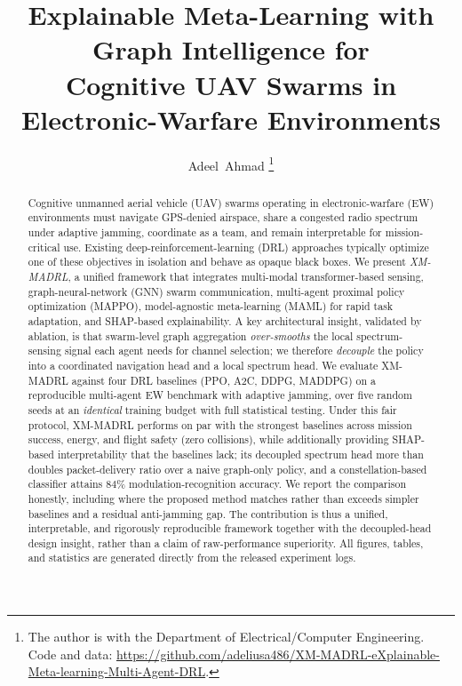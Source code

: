 \documentclass[journal]{IEEEtran}
\begin{document}
\title{Explainable Meta-Learning with Graph Intelligence for\\
Cognitive UAV Swarms in Electronic-Warfare Environments}

\author{Adeel~Ahmad
\thanks{The author is with the Department of Electrical/Computer Engineering.
Code and data: \url{https://github.com/adeliusa486/XM-MADRL-eXplainable-Meta-learning-Multi-Agent-DRL}.}}

\maketitle

\begin{abstract}
Cognitive unmanned aerial vehicle (UAV) swarms operating in electronic-warfare
(EW) environments must navigate GPS-denied airspace, share a congested radio
spectrum under adaptive jamming, coordinate as a team, and remain interpretable
for mission-critical use. Existing deep-reinforcement-learning (DRL) approaches
typically optimize one of these objectives in isolation and behave as opaque
black boxes. We present \emph{XM-MADRL}, a unified framework that integrates
multi-modal transformer-based sensing, graph-neural-network (GNN) swarm
communication, multi-agent proximal policy optimization (MAPPO), model-agnostic
meta-learning (MAML) for rapid task adaptation, and SHAP-based explainability. A
key architectural insight, validated by ablation, is that swarm-level graph
aggregation \emph{over-smooths} the local spectrum-sensing signal each agent
needs for channel selection; we therefore \emph{decouple} the policy into a
coordinated navigation head and a local spectrum head. We evaluate XM-MADRL
against four DRL baselines (PPO, A2C, DDPG, MADDPG) on a reproducible
multi-agent EW benchmark with adaptive jamming, over five random seeds at an
\emph{identical} training budget with full statistical testing. Under this fair
protocol, XM-MADRL performs on par with the strongest baselines across mission
success, energy, and flight safety (zero collisions), while additionally
providing SHAP-based interpretability that the baselines lack; its decoupled
spectrum head more than doubles packet-delivery ratio over a naive graph-only
policy, and a constellation-based classifier attains $84\%$ modulation-recognition
accuracy. We report the comparison honestly, including where the proposed method
matches rather than exceeds simpler baselines and a residual anti-jamming gap.
The contribution is thus a unified, interpretable, and rigorously reproducible
framework together with the decoupled-head design insight, rather than a claim of
raw-performance superiority.
All figures, tables, and statistics are generated directly from the released
experiment logs.
\end{abstract}
\end{document}
